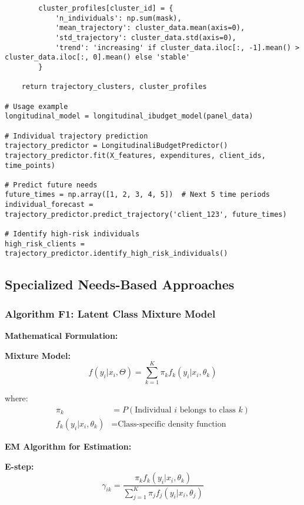 \documentclass[12pt]{article}
\begin{document}
\begin{lstlisting}
        cluster_profiles[cluster_id] = {
            'n_individuals': np.sum(mask),
            'mean_trajectory': cluster_data.mean(axis=0),
            'std_trajectory': cluster_data.std(axis=0),
            'trend': 'increasing' if cluster_data.iloc[:, -1].mean() > cluster_data.iloc[:, 0].mean() else 'stable'
        }
    
    return trajectory_clusters, cluster_profiles

# Usage example
longitudinal_model = longitudinal_ibudget_model(panel_data)

# Individual trajectory prediction
trajectory_predictor = LongitudinaliBudgetPredictor()
trajectory_predictor.fit(X_features, expenditures, client_ids, time_points)

# Predict future needs
future_times = np.array([1, 2, 3, 4, 5])  # Next 5 time periods
individual_forecast = trajectory_predictor.predict_trajectory('client_123', future_times)

# Identify high-risk individuals
high_risk_clients = trajectory_predictor.identify_high_risk_individuals()
\end{lstlisting}

\subsection{Specialized Needs-Based Approaches}

\subsubsection{Algorithm F1: Latent Class Mixture Model}

\textbf{Mathematical Formulation:}

\textbf{Mixture Model:}
\begin{equation}
f(y_i | x_i, \Theta) = \sum_{k=1}^{K} \pi_k f_k(y_i | x_i, \theta_k)
\end{equation}

where:
\begin{align}
\pi_k &= P(\text{Individual } i \text{ belongs to class } k) \\
f_k(y_i | x_i, \theta_k) &= \text{Class-specific density function}
\end{align}

\textbf{EM Algorithm for Estimation:}

\textbf{E-step:}
\begin{equation}
\gamma_{ik} = \frac{\pi_k f_k(y_i | x_i, \theta_k)}{\sum_{j=1}^{K} \pi_j f_j(y_i | x_i, \theta_j)}
\end{equation}
\end{document}
